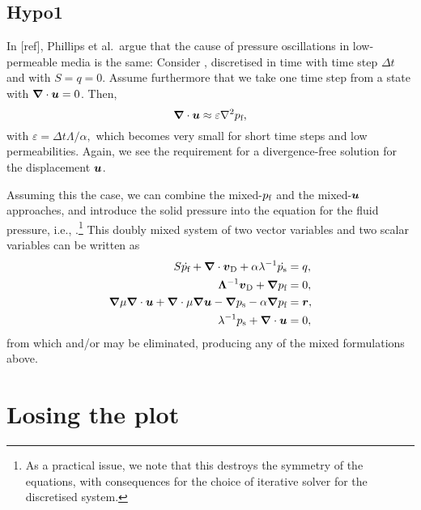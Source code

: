 \subsection{Hypo1}

In [ref], Phillips et al.~argue that the cause of pressure oscillations in
low-permeable media is the same: Consider , discretised in time
with time step $\Delta t$ and with $S=q=0$.
Assume furthermore that we take one time step from a state with
$\nabla\cdot\U=0$.
Then,
\begin{equation}
  \nabla\cdot\U \approx \varepsilon \onabla^2 \Pf,
\end{equation}
with $\varepsilon=\Delta t \Lambda / \alpha,$ which becomes very small for
short time steps and low permeabilities.
Again, we see the requirement for a divergence-free solution for the
displacement $\boldsymbol{u}$.

Assuming this the case, we can combine the mixed-$p_{\text{f}}$ and the mixed-$\boldsymbol{u}$
approaches, and introduce the solid pressure into the equation for the fluid
pressure, i.e., .\footnote{As a practical issue, we note
  that this destroys the symmetry of the equations, with consequences for the
  choice of iterative solver for the discretised system.}
This doubly mixed system of two vector variables and two scalar variables can be
written as
\begin{align}
S\dot{\Pf} + \nabla \cdot \vD + \alpha \lambda^{-1} \dot{\Ps} &= q, \\
\label{eq:mixp}
  \Lambda^{-1} \vD + \nabla \Pf &= 0,\\
\nabla \mu \nabla \cdot \U + \nabla \cdot \mu \nabla \U
 - \nabla \Ps - \alpha \nabla \Pf &= \V{r},\\
\label{eq:mixu}
\lambda^{-1}\Ps+\nabla\cdot\U &= 0,
\end{align}
from which  and/or  may be eliminated, producing any of
the mixed formulations above.

\section{Losing the plot}

